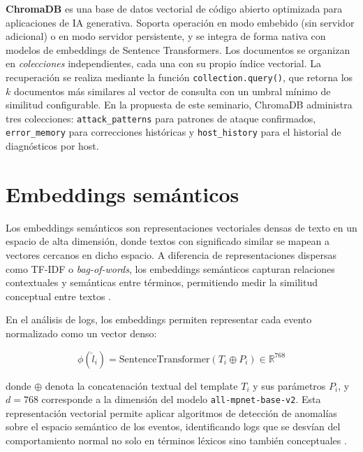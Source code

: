 \textbf{ChromaDB} es una base de datos vectorial de código abierto
optimizada para aplicaciones de IA generativa. Soporta operación
en modo embebido (sin servidor adicional) o en modo servidor
persistente, y se integra de forma nativa con modelos de embeddings
de Sentence Transformers. Los documentos se organizan en
\textit{colecciones} independientes, cada una con su propio índice
vectorial. La recuperación se realiza mediante la función
\texttt{collection.query()}, que retorna los $k$ documentos más
similares al vector de consulta con un umbral mínimo de similitud
configurable. En la propuesta de este seminario, ChromaDB
administra tres colecciones: \texttt{attack\_patterns} para patrones
de ataque confirmados, \texttt{error\_memory} para correcciones
históricas y \texttt{host\_history} para el historial de
diagnósticos por host.

\section{Embeddings semánticos}

Los embeddings semánticos son representaciones vectoriales densas de texto en un espacio de alta dimensión, donde textos con significado similar se mapean a vectores cercanos en dicho espacio. A diferencia de representaciones dispersas como TF-IDF o \textit{bag-of-words}, los embeddings semánticos capturan relaciones contextuales y semánticas entre términos, permitiendo medir la similitud conceptual entre textos \cite{liu2024logcem}.

En el análisis de logs, los embeddings permiten representar cada evento normalizado como un vector denso:

\begin{equation}
    \phi(\hat{l}_i) = \text{SentenceTransformer}(T_i \oplus P_i) \in \mathbb{R}^{768}
\end{equation}

\noindent donde $\oplus$ denota la concatenación textual del template $T_i$ y sus parámetros $P_i$, y $d = 768$ corresponde a la dimensión del modelo \texttt{all-mpnet-base-v2}. Esta representación vectorial permite aplicar algoritmos de detección de anomalías sobre el espacio semántico de los eventos, identificando logs que se desvían del comportamiento normal no solo en términos léxicos sino también conceptuales \cite{chen2025gelog}.